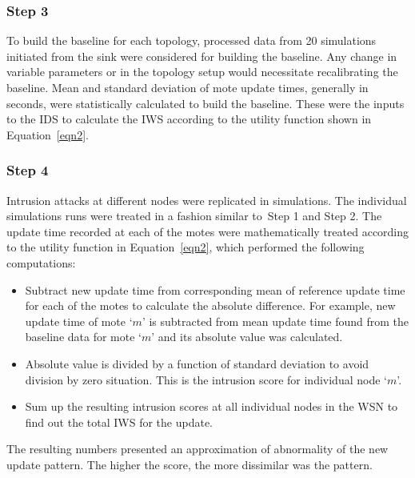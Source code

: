 \documentclass[conference]{IEEEtran}
\newcommand{\notedme}[1]{\raisebox{0pt}[0pt][0pt]{\pdfcomment[open=true,color=blue]{#1}}}
\begin{document}
\subsubsection*{Step 3} 
To build the baseline for each topology, processed data from 20 simulations initiated from the sink were considered for building the baseline.
Any change in variable parameters or in the topology setup would necessitate recalibrating the baseline.
Mean and standard deviation of mote update times, generally in seconds, were statistically calculated to build the baseline.
These were the inputs to the IDS to calculate the IWS according to the utility function shown in Equation~\ref{eqn2}. 


\subsubsection*{Step 4} 
Intrusion attacks at different nodes were replicated in simulations.
The individual simulations runs were treated in a fashion  similar to~Step 1 and Step 2.
The update time recorded at each of the motes were mathematically treated according to the utility function in Equation~\ref{eqn2}, which performed the following computations:
\begin{itemize}
\item Subtract new update time from corresponding mean of reference update time for each of the motes to calculate the absolute difference. For example, new update time of mote `$m$' is subtracted from mean update time found from the baseline data for mote `$m$' and its absolute value was calculated.
\item Absolute value is divided by a function of standard deviation to avoid division by zero situation. 
This is the intrusion score for individual node `$m$'.
\item Sum up the resulting intrusion scores at all individual nodes in the WSN to find out the total IWS for the update.
\end{itemize}
The resulting numbers  presented an approximation of abnormality of the new update pattern. The higher the score, the more dissimilar was the pattern. 
\end{document}
